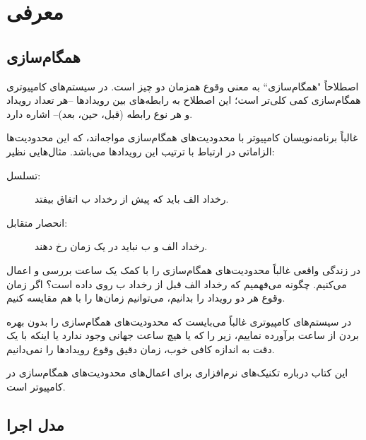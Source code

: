 \documentclass{book}
\newcommand{\clearemptydoublepage}{\newpage\cleardoublepage}
\newcommand{\myquote}[1]{"#1``}
\begin{document}

\tableofcontents
\clearemptydoublepage

\mainmatter


\chapter{معرفی}

\section{همگام‌‌سازی}
\label{synch}

اصطلاحاً \myquote{همگام‌سازی} به معنی وقوع همزمان دو چیز است. در سیستم‌های کامپیوتری همگام‌سازی کمی کلی‌تر است؛
    این اصطلاح به رابطه‌های بین رویدادها --هر تعداد رویداد و هر نوع رابطه (قبل، حین، بعد)-- اشاره دارد.
    
غالباً برنامه‌نویسان کامپیوتر با محدودیت‌های همگام‌سازی مواجه‌اند، که این محدودیت‌ها الزاماتی در ارتباط با ترتیب این رویدادها می‌باشد.
مثال‌هایی نظیر:

\begin{description}

\item%
    [تسلسل:] رخداد الف باید که پیش از رخداد ب اتفاق بیفتد. 

\item%
[انحصار متقابل:] رخداد الف و ب نباید در یک زمان رخ دهند.

\end{description}
    در زندگی واقعی غالباً محدودیت‌های همگام‌سازی را با کمک یک ساعت بررسی و اعمال می‌کنیم. 
    چگونه می‌‌فهمیم که رخداد الف قبل از رخداد ب روی داده است؟ اگر زمان وقوع هر دو رویداد را بدانیم، می‌توانیم زمان‌ها را با هم مقایسه کنیم.
    
    در سیستم‌های کامپیوتری غالباً می‌بایست که محدودیت‌های همگام‌سازی را بدون بهر‌ه بردن از ساعت بر‌آورده نماییم، 
    زیر را که یا هیچ ساعت جهانی وجود ندارد یا اینکه با یک دقت به اندازه کافی خوب، زمان دقیق وقوع رویدادها را نمی‌دانیم.

    این کتاب درباره تکنیک‌های نرم‌افزاری برای اعمال‌های محدودیت‌های همگام‌سازی در کامپیوتر است.



\section {مدل اجرا}
\end{document}
